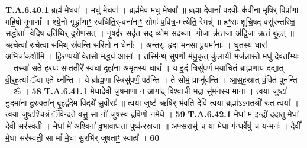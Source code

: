 \documentclass[17pt]{extarticle}
\begin{document}
                  \newline
                                                         \textbf{} \newline \newline
                                \textbf{ T.A.6.40.1} \newline
                  ब्रह्म॑ मे॒धवा᳚ । मधु॑ मे॒धवा᳚ । ब्रह्म॑मे॒व मधु॑ मे॒धवा᳚ ॥ ब्र॒ह्मा दे॒वानां᳚ पद॒वीः क॑वी॒ना-मृषि॒र् विप्रा॑णां महि॒षो मृ॒गाणां᳚ ।  श्ये॒नो गृद्ध्रा॑णाꣳ॒॒ स्वधि॑ति॒र्-वना॑नाꣳ॒॒ सोमः॑ प॒वित्र॒॒-मत्ये॑ति॒ रेभन्न्॑ ॥  हꣳ॒॒सः शु॑चि॒षद् वसु॑रन्तरिक्ष॒ सद्धोता॑- वेदि॒ष-दति॑थिर्-दुरोण॒सत् ।  नृ॒षद्व॑र॒-सदृ॑त॒-सद् व्यो॑म॒-सद॒ब्जा- गो॒जा ऋ॑त॒जा अ॑द्रि॒जा ऋ॒तं बृ॒हत् ॥ ऋ॒चेत्वा॑ रु॒चेत्वा॒ समिथ् स्र॑वन्ति स॒रितो॒ न धेना᳚: ।  अ॒न्तर्. हृ॒दा मन॑सा पू॒यमा॑नाः ।  घृ॒तस्य॒ धारा॑ अ॒भिचा॑कशीमि ।  हि॒र॒ण्ययो॑ वेत॒सो मद्ध्य॑ आसां ।  तस्मि᳚न्थ् सुप॒र्णो म॑धु॒कृत् कु॑ला॒यी भज॑न्नास्ते॒ मधु॑ दे॒वता᳚भ्यः ।  तस्या॑ सते॒ हर॑यः स॒प्ततीरे᳚ स्व॒धां दुहा॑ना अ॒मृत॑स्य॒ धारां᳚ । य इ॒दं त्रिसु॑पर्ण॒-मया॑चितं ब्राह्म॒णाय॑ दद्यात् । वी॒र॒ह॒त्यां ॅवा ए॒ते घ्न॑न्ति । ये ब्रा᳚ह्म॒णा-स्त्रिसु॑पर्णं॒ पठ॑न्ति ।  ते सोमं॒ प्राप्नु॑वन्ति । आ॒स॒ह॒स्रात् पं॒क्तिं पुन॑न्ति । ॐ । \textbf{ 58} \newline
                  \newline
                                                         \textbf{} \newline \newline
                                \textbf{ T.A.6.41.1} \newline
                  मे॒धादे॒वी जु॒षमा॑णा न॒ आगा᳚द् वि॒श्वाची॑ भ॒द्रा सु॑मन॒स्य मा॑ना । त्वया॒ जुष्टा॑ नु॒दमा॑ना दु॒रुक्ता᳚न् बृ॒हद्व॑देम वि॒दथे॑ सु॒वीराः᳚ ॥  त्वया॒ जुष्ट॑ ऋ॒षिर् भ॑वति देवि॒ त्वया॒ ब्रह्मा॑ऽऽग॒तश्री॑ रु॒त त्वया᳚ । त्वया॒ जुष्ट॑श्चि॒त्रं ॅवि॑न्दते वसु॒ सा नो॑ जुषस्व॒ द्रवि॑णो नमेधे । \textbf{ 59} \newline
                  \newline
                                                         \textbf{} \newline \newline
                                \textbf{ T.A.6.42.1} \newline
                  मे॒धां म॒ इन्द्रो॑ ददातु मे॒धां दे॒वी सर॑स्वती ।  मे॒धां मे॑ अ॒श्विना॑-वु॒भावाध॑त्तां॒ पुष्क॑रस्रजा ॥ अ॒फ्स॒रासु॑ च॒ या मे॒धा ग॑न्ध॒र्वेषु॑ च॒ यन्मनः॑ ।  दैवीं᳚ मे॒धा सर॑स्वती॒ सा मां᳚ मे॒धा सु॒रभि॑र् जुषताꣳ॒॒ स्वाहा᳚ । \textbf{ 60} \newline
                  \newline
\end{document}
